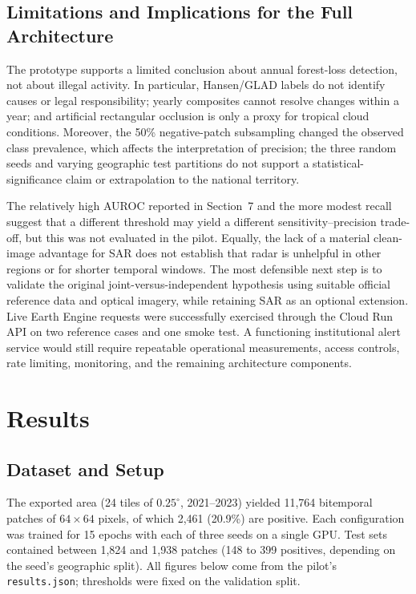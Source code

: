 \documentclass{article}
\begin{document}
\subsection{Limitations and Implications for the Full Architecture}
\label{subsec:prototype-limitations}

The prototype supports a limited conclusion about annual forest-loss detection, not about illegal activity. In particular, Hansen/GLAD labels do not identify causes or legal responsibility; yearly composites cannot resolve changes within a year; and artificial rectangular occlusion is only a proxy for tropical cloud conditions. Moreover, the 50\% negative-patch subsampling changed the observed class prevalence, which affects the interpretation of precision; the three random seeds and varying geographic test partitions do not support a statistical-significance claim or extrapolation to the national territory.

The relatively high AUROC reported in Section~7 and the more modest recall suggest that a different threshold may yield a different sensitivity--precision trade-off, but this was not evaluated in the pilot. Equally, the lack of a material clean-image advantage for SAR does not establish that radar is unhelpful in other regions or for shorter temporal windows. The most defensible next step is to validate the original joint-versus-independent hypothesis using suitable official reference data and optical imagery, while retaining SAR as an optional extension. Live Earth Engine requests were successfully exercised through the Cloud Run API on two reference cases and one smoke test. A functioning institutional alert service would still require repeatable operational measurements, access controls, rate limiting, monitoring, and the remaining architecture components.


\section{Results}
\label{sec:results}

\subsection{Dataset and Setup}

The exported area (24 tiles of $0.25^\circ$, 2021--2023) yielded 11{,}764
bitemporal patches of $64\times64$ pixels, of which 2{,}461 (20.9\%) are
positive.
Each configuration was trained for 15 epochs with each of three seeds on a
single GPU.
Test sets contained between 1{,}824 and 1{,}938 patches (148 to 399 positives,
depending on the seed's geographic split).
All figures below come from the pilot's \texttt{results.json}; thresholds were
fixed on the validation split.
\end{document}
